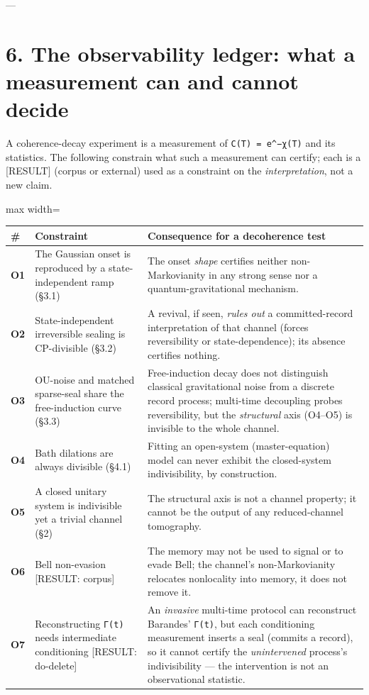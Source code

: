 \documentclass[11pt]{article}
\begin{document}
---

\section*{6. The observability ledger: what a measurement can and cannot decide}
A coherence-decay experiment is a measurement of \texttt{C(T) = e\textasciicircum{}{−χ(T)}} and its statistics. The following constrain what such a measurement can certify; each is a [RESULT] (corpus or external) used as a constraint on the \emph{interpretation}, not a new claim.

\begin{center}
\begin{adjustbox}{max width=\textwidth}
\begin{tabular}{lll}
\# & Constraint & Consequence for a decoherence test \\
\hline
\textbf{O1} & The Gaussian onset is reproduced by a state-independent ramp (§3.1) & The onset \emph{shape} certifies neither non-Markovianity in any strong sense nor a quantum-gravitational mechanism. \\
\textbf{O2} & State-independent irreversible sealing is CP-divisible (§3.2) & A revival, if seen, \emph{rules out} a committed-record interpretation of that channel (forces reversibility or state-dependence); its absence certifies nothing. \\
\textbf{O3} & OU-noise and matched sparse-seal share the free-induction curve (§3.3) & Free-induction decay does not distinguish classical gravitational noise from a discrete record process; multi-time decoupling probes reversibility, but the \emph{structural} axis (O4–O5) is invisible to the whole channel. \\
\textbf{O4} & Bath dilations are always divisible (§4.1) & Fitting an open-system (master-equation) model can never exhibit the closed-system indivisibility, by construction. \\
\textbf{O5} & A closed unitary system is indivisible yet a trivial channel (§2) & The structural axis is not a channel property; it cannot be the output of any reduced-channel tomography. \\
\textbf{O6} & Bell non-evasion [RESULT: corpus] & The memory may not be used to signal or to evade Bell; the channel's non-Markovianity relocates nonlocality into memory, it does not remove it. \\
\textbf{O7} & Reconstructing \texttt{Γ(t)} needs intermediate conditioning [RESULT: do-delete] & An \emph{invasive} multi-time protocol can reconstruct Barandes' \texttt{Γ(t)}, but each conditioning measurement inserts a seal (commits a record), so it cannot certify the \emph{unintervened} process's indivisibility — the intervention is not an observational statistic. \\
\end{tabular}
\end{adjustbox}
\end{center}
\end{document}
